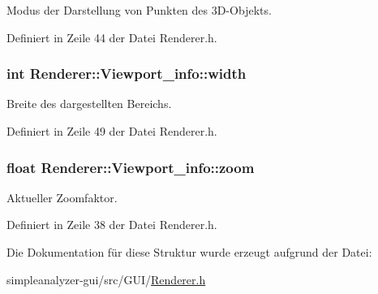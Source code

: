 Modus der Darstellung von Punkten des 3\-D-\/\-Objekts. 



Definiert in Zeile 44 der Datei Renderer.\-h.

\hypertarget{structRenderer_1_1Viewport__info_af0617337cfe95f9d5a21420335474bea}{
\subsubsection[{width}]{\setlength{\rightskip}{0pt plus 5cm}int Renderer\-::\-Viewport\-\_\-info\-::width}}\label{structRenderer_1_1Viewport__info_af0617337cfe95f9d5a21420335474bea}


Breite des dargestellten Bereichs. 



Definiert in Zeile 49 der Datei Renderer.\-h.

\hypertarget{structRenderer_1_1Viewport__info_a9bbc5e50fed7334fb237e620e6080e5e}{
\subsubsection[{zoom}]{\setlength{\rightskip}{0pt plus 5cm}float Renderer\-::\-Viewport\-\_\-info\-::zoom}}\label{structRenderer_1_1Viewport__info_a9bbc5e50fed7334fb237e620e6080e5e}


Aktueller Zoomfaktor. 



Definiert in Zeile 38 der Datei Renderer.\-h.



Die Dokumentation für diese Struktur wurde erzeugt aufgrund der Datei\-:\begin{DoxyCompactItemize}
\item 
simpleanalyzer-\/gui/src/\-G\-U\-I/\hyperlink{Renderer_8h}{Renderer.\-h}\end{DoxyCompactItemize}
